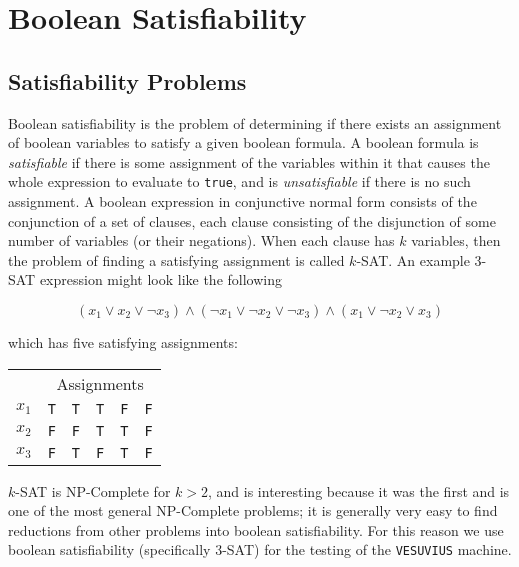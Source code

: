 \chapter{Boolean Satisfiability}
\section{Satisfiability Problems}
Boolean satisfiability is the problem of determining if there exists an assignment of boolean variables to satisfy a given boolean formula.  A boolean formula is \emph{satisfiable} if there is some assignment of the variables within it that causes the whole expression to evaluate to \texttt{true}, and is \emph{unsatisfiable} if there is no such assignment.  
A boolean expression in conjunctive normal form consists of the conjunction of a set of clauses, each clause consisting of the disjunction of some number of variables (or their negations).  When each clause has $k$ variables, then the problem of finding a satisfying assignment is called $k$-SAT.  An example 3-SAT expression might look like the following

\begin{equation}
	(x_1 \vee x_2 \vee \neg x_3) \wedge (\neg x_1 \vee \neg x_2 \vee \neg x_3) \wedge (x_1 \vee \neg x_2 \vee x_3)
\end{equation}

which has five satisfying assignments:

\begin{center}
\begin{tabular}{l || l | l | l | l | l}
	\multicolumn{1}{l}{} & \multicolumn{5}{c}{Assignments} \\
	$x_1$ & \texttt{T} & \texttt{T} & \texttt{T} & \texttt{F} & \texttt{F} \\
	$x_2$ & \texttt{F} & \texttt{F} & \texttt{T} & \texttt{T} & \texttt{F} \\
	$x_3$ & \texttt{F} & \texttt{T} & \texttt{F} & \texttt{T} & \texttt{F} \\
\end{tabular}
\end{center}

$k$-SAT is NP-Complete\cite{sat} for $k > 2$, and is interesting because it was the first and is one of the most general NP-Complete problems; it is generally very easy to find reductions from other problems into boolean satisfiability.  For this reason we use boolean satisfiability (specifically 3-SAT) for the testing of the \texttt{VESUVIUS} machine.

